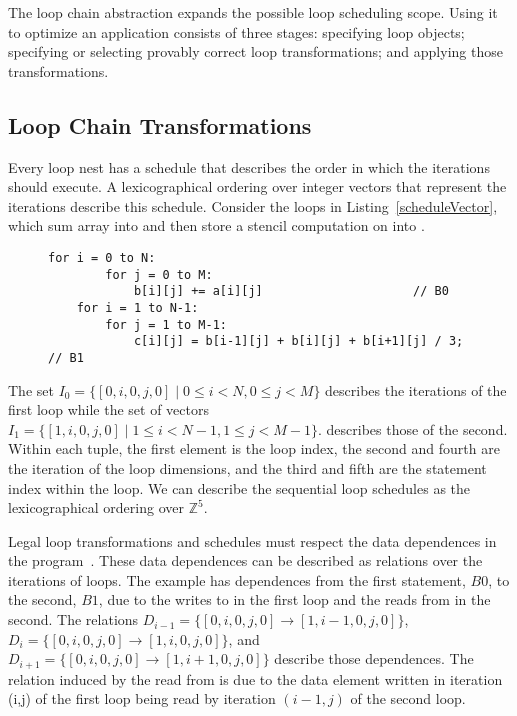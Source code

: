 The loop chain abstraction expands the possible loop scheduling scope.
Using it to optimize an application consists of three stages:
specifying loop objects; specifying or selecting provably correct loop
transformations; and applying those transformations.

\subsection{Loop Chain Transformations}

Every loop nest has a schedule that describes the order in which the 
iterations should execute.
A lexicographical ordering over integer vectors that represent the
iterations describe this schedule.
Consider the loops in Listing~\ref{scheduleVector}, which sum array
 into  and then store a stencil computation on 
into .

\begin{figure}[t]
	\begin{lstlisting}[label={scheduleVector},caption={Example Loop Chain}]
	for i = 0 to N:
		for j = 0 to M:
			b[i][j] += a[i][j]                     // B0
	for i = 1 to N-1:
		for j = 1 to M-1:
			c[i][j] = b[i-1][j] + b[i][j] + b[i+1][j] / 3;     // B1
	\end{lstlisting}
	\end{figure}


The set $I_{0}=\{[0,i,0,j,0] \; | \; 0 \leq i < N, 0 \leq j < M\}$ describes
the iterations of the first loop while the set of vectors
$I_{1} = \{[1,i,0,j,0] \; | \; 1 \leq i < N-1, 1 \leq j < M-1\}$. describes
those of the second.
Within each tuple, the first element is the loop index, the second and fourth are the iteration of the loop dimensions, and the third and fifth are the statement index within the loop. 
We can describe the sequential loop schedules as the lexicographical ordering over
$\mathbb{Z}^{5}$.

Legal loop transformations and schedules must respect the data dependences
in the program~\cite{frameworkKP95pub}.
These data dependences can be described as relations over the iterations 
of loops.
The example has dependences from the first statement, $B0$, to the second,
$B1$, due to the writes to  in the first loop and the reads from
 in the second. 
The relations $D_{i-1} = \{[0,i,0,j,0] \to [1,i-1,0,j,0]\}$,
$D_{i} = \{[0,i,0,j,0] \to [1,i,0,j,0]\}$, and
$D_{i+1} = \{[0,i,0,j,0] \to [1,i+1,0,j,0]\}$ describe those dependences. 
The relation induced by the read from  
is due to the data element written in iteration (i,j) of the
first loop being read by iteration $(i-1,j)$ of the second loop. %

